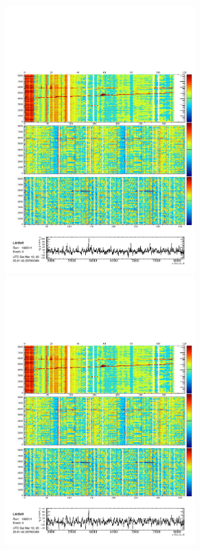 \begin{figure}
\begin{subfigure}[t]{\linewidth}
\begin{minipage}{0.48\textwidth}
    \end{minipage}
    \begin{minipage}{0.48\textwidth}
      \centering
      \includegraphics[width=0.8\textwidth]{DataMuonZ1.pdf}
      \includegraphics[width=0.8\textwidth]{DataMuonZ2.pdf}

\end{minipage}
\end{subfigure}
\end{figure}
